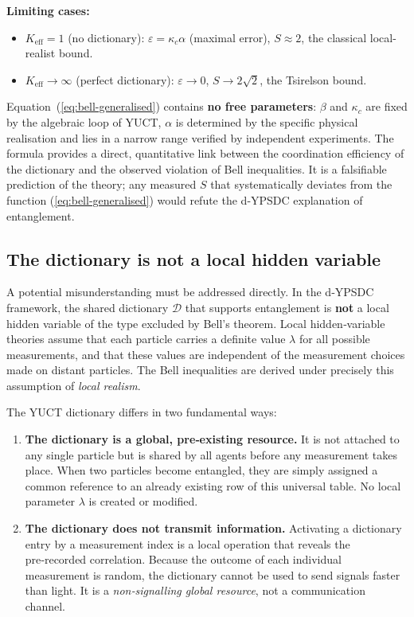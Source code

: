 \documentclass[12pt,a4paper]{article}
\theoremstyle{remark}
\begin{document}
	\noindent
	\textbf{Limiting cases:}
	\begin{itemize}
		\item $K_{\mathrm{eff}}=1$ (no dictionary): $\varepsilon = \kappa_c\alpha$ (maximal error),
		$S \approx 2$, the classical local-realist bound.
		\item $K_{\mathrm{eff}}\to\infty$ (perfect dictionary): $\varepsilon\to0$, $S\to 2\sqrt{2}$,
		the Tsirelson bound.
	\end{itemize}
	
	Equation~(\ref{eq:bell-generalised}) contains \textbf{no free parameters}: $\beta$ and $\kappa_c$
	are fixed by the algebraic loop of YUCT, $\alpha$ is determined by the specific physical realisation
	and lies in a narrow range verified by independent experiments.  The formula provides a direct,
	quantitative link between the coordination efficiency of the dictionary and the observed violation
	of Bell inequalities.  It is a falsifiable prediction of the theory; any measured $S$ that
	systematically deviates from the function (\ref{eq:bell-generalised}) would refute the d-YPSDC
	explanation of entanglement.
	
\subsection*{The dictionary is not a local hidden variable}

A potential misunderstanding must be addressed directly.  In the d‑YPSDC
framework, the shared dictionary $\mathcal{D}$ that supports entanglement is
\textbf{not} a local hidden variable of the type excluded by Bell's theorem.
Local hidden‑variable theories assume that each particle carries a definite
value $\lambda$ for all possible measurements, and that these values are
independent of the measurement choices made on distant particles.  The Bell
inequalities are derived under precisely this assumption of \emph{local
	realism}.

The YUCT dictionary differs in two fundamental ways:

\begin{enumerate}[leftmargin=*]
	\item \textbf{The dictionary is a global, pre‑existing resource.}
	It is not attached to any single particle but is shared by all agents
	before any measurement takes place.  When two particles become entangled,
	they are simply assigned a common reference to an already existing row
	of this universal table.  No local parameter $\lambda$ is created or
	modified.
	
	\item \textbf{The dictionary does not transmit information.}
	Activating a dictionary entry by a measurement index is a local operation
	that reveals the pre‑recorded correlation.  Because the outcome of each
	individual measurement is random, the dictionary cannot be used to send
	signals faster than light.  It is a \emph{non‑signalling global resource},
	not a communication channel.
\end{enumerate}
\end{document}
